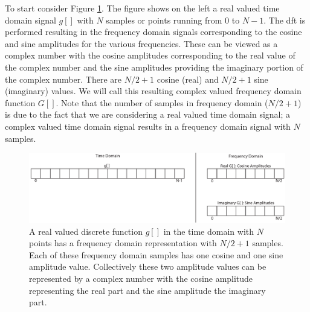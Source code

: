 To start consider Figure \ref{fig:basic-DFT}. The figure shows on the left a real valued time domain signal $g[ ]$ with $N$ samples or points running from $0$ to $N-1$. The \gls{dft} is performed resulting in the frequency domain signals corresponding to the cosine and sine amplitudes for the various frequencies. These can be viewed as a complex number with the cosine amplitudes corresponding to the real value of the complex number and the sine amplitudes providing the imaginary portion of the complex number. There are $N/2 + 1$ cosine (real) and $N/2 + 1$ sine (imaginary) values. We will call this resulting complex valued frequency domain function $G[ ]$. Note that the number of samples in frequency domain ($N/2 + 1$) is due to the fact that we are considering a real valued time domain signal; a complex valued time domain signal results in a frequency domain signal with $N$ samples.

\begin{figure}
\centering
\includegraphics[width=\textwidth]{images/basic-DFT}
\caption{ A real valued discrete function $g[ ]$ in the time domain with $N$ points has a frequency domain representation with $N/2 + 1$ samples. Each of these frequency domain samples has one cosine and one sine amplitude value. Collectively these two amplitude values can be represented by a complex number with the cosine amplitude representing the real part and the sine amplitude the imaginary part. }
\label{fig:basic-DFT}
\end{figure}



